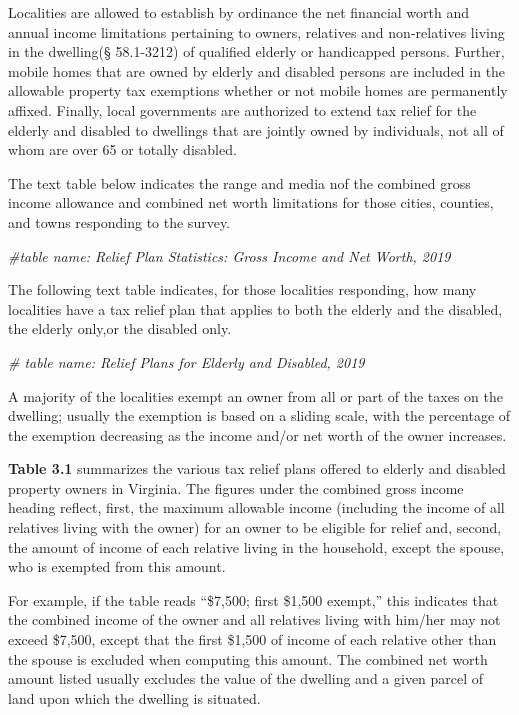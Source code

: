 \documentclass[
]{book}
\newenvironment{Shaded}{\begin{snugshade}}{\end{snugshade}}
\newcommand{\CommentTok}[1]{\textcolor[rgb]{0.56,0.35,0.01}{\textit{#1}}}
\begin{document}
Localities are allowed to establish by ordinance the net financial worth and annual income limitations pertaining to
owners, relatives and non-relatives living in the dwelling(§ 58.1-3212) of qualified elderly or handicapped persons.
Further, mobile homes that are owned by elderly and disabled persons are included in the allowable property tax
exemptions whether or not mobile homes are permanently affixed. Finally, local governments are authorized to extend
tax relief for the elderly and disabled to dwellings that are jointly owned by individuals, not all of whom are over 65
or totally disabled.

The text table below indicates the range and media nof the combined gross income allowance and combined
net worth limitations for those cities, counties, and towns responding to the survey.

\begin{Shaded}
\begin{Highlighting}[]
\CommentTok{\#table name: Relief Plan Statistics: Gross Income and Net Worth, 2019}
\end{Highlighting}
\end{Shaded}

The following text table indicates, for those localities responding, how many localities have a tax relief plan that
applies to both the elderly and the disabled, the elderly only,or the disabled only.

\begin{Shaded}
\begin{Highlighting}[]
\CommentTok{\# table name: Relief Plans for Elderly and Disabled, 2019}
\end{Highlighting}
\end{Shaded}

A majority of the localities exempt an owner from all or part of the taxes on the dwelling; usually the exemption is based on a sliding scale, with the percentage of the exemption decreasing as the income and/or net worth of the owner increases.

\textbf{Table 3.1} summarizes the various tax relief plans offered to elderly and disabled property owners in Virginia.
The figures under the combined gross income heading reflect, first, the maximum allowable income (including the
income of all relatives living with the owner) for an owner to be eligible for relief and, second, the amount of income
of each relative living in the household, except the spouse, who is exempted from this amount.

For example, if the table reads ``\$7,500; first \$1,500 exempt,'' this indicates that the combined income of the
owner and all relatives living with him/her may not exceed \$7,500, except that the first \$1,500 of income of each relative other than the spouse is excluded when computing this amount. The combined net worth amount listed usually
excludes the value of the dwelling and a given parcel of land upon which the dwelling is situated.
\end{document}

